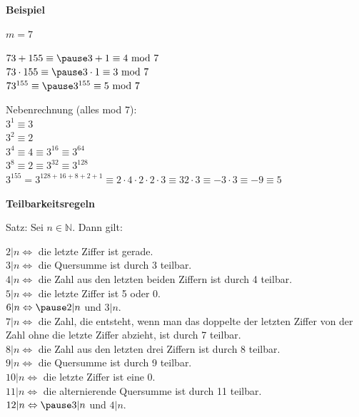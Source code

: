 \begin{frame}[fragile]

\textbf{Beispiel} 

$m =7$

$73 + 155 \equiv \pause 3 +1 \equiv 4 \text{ mod }7$ \\ \pause
$73 \cdot 155 \equiv \pause 3 \cdot 1 \equiv 3 \text{ mod }7$ \\ \pause
$73^{155} \equiv \pause 3^ {155} \equiv 5 \text{ mod }7$ 

Nebenrechnung (alles mod 7): \\
$3^1 \equiv 3$ \\
$3^2 \equiv 2$ \\
$3^4 \equiv 4 \equiv 3^{16} \equiv 3^{64}$ \\
$3^8 \equiv 2 \equiv 3^{32} \equiv 3^{128}$ \\
$3^{155} = 3^{128+16+8+2+1} \equiv 2 \cdot 4 \cdot 2 \cdot 2 \cdot 3 \equiv 32 \cdot 3 \equiv -3 \cdot 3 \equiv -9 \equiv 5$
\end{frame}

\begin{frame}[fragile]
\textbf{Teilbarkeitsregeln} 

Satz: Sei $n \in \mathbb{N}$. Dann gilt:

$2|n \Leftrightarrow$ \pause die letzte Ziffer ist gerade. \\
$3|n \Leftrightarrow$ \pause die Quersumme ist durch 3 teilbar. \\
$4|n \Leftrightarrow$  \pause die Zahl aus den letzten beiden Ziffern ist durch 4 teilbar. \\
$5|n \Leftrightarrow$  \pause die letzte Ziffer ist 5 oder 0. \\
$6|n \Leftrightarrow  \pause 2|n$ und $3|n$. \\
$7|n \Leftrightarrow$  \pause die Zahl, die entsteht, wenn man das doppelte der letzten Ziffer von der Zahl ohne die letzte Ziffer abzieht, ist durch 7 teilbar.\\
$8|n \Leftrightarrow$  \pause die Zahl aus den letzten drei Ziffern ist durch 8 teilbar. \\
$9|n \Leftrightarrow$  \pause  die Quersumme ist durch 9 teilbar.\\
$10|n \Leftrightarrow$ \pause  die letzte Ziffer ist eine 0. \\
$11|n \Leftrightarrow$  \pause die alternierende Quersumme ist durch 11 teilbar. \\
$12|n \Leftrightarrow  \pause  3|n$ und $4|n$.  \\

\end{frame}

